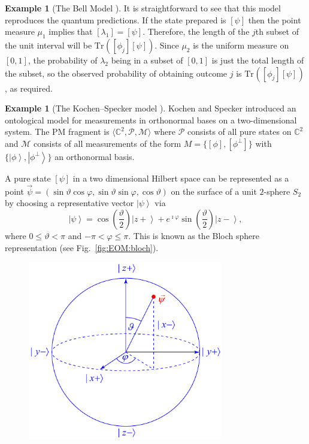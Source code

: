 \documentclass[DIV=calc,fontsize=12pt]{scrartcl} %
\theoremstyle{definition}
\newtheorem{example}[definition]{Example}
\theoremstyle{plain}
\newcommand{\Ket}[1]{\ensuremath{\left \vert #1 \right \rangle}}
\newcommand{\Proj}[1]{\ensuremath{\left [ #1 \right ]}}
\newcommand{\Tr}[2][]{\ensuremath{\text{Tr}_{#1} \left ( #2 \right )}}
\begin{document}
\begin{example}[The Bell Model \cite{Bell1966}]
It is straightforward to see that this model reproduces the quantum
predictions.  If the state prepared is $\Proj{\psi}$ then the point
measure $\mu_1$ implies that $\Proj{\lambda_1} = \Proj{\psi}$.
Therefore, the length of the $j$th subset of the unit interval will
be $\Tr{\Proj{\phi_j}\Proj{\psi}}$.  Since $\mu_2$ is the
uniform measure on $[0,1]$, the probability of $\lambda_2$ being in
a subset of $[0,1]$ is just the total length of the subset, so the
observed probability of obtaining outcome $j$ is
$\Tr{\Proj{\phi_j}\Proj{\psi}}$, as required.
\end{example}

\begin{example}[The Kochen--Specker model \cite{Kochen1967}]
\label{exa:EOM:KS}
Kochen and Specker introduced an ontological model for measurements
in orthonormal bases on a two-dimensional system.  The
PM fragment is $\langle \mathbb{C}^2, \mathcal{P},
\mathcal{M} \rangle$ where $\mathcal{P}$ consists of all pure states
on $\mathbb{C}^2$ and $\mathcal{M}$ consists of all measurements of
the form $M = \{\Proj{\phi},\Proj{\phi^{\perp}}\}$ with
$\{\Ket{\phi},\Ket{\phi^{\perp}}\}$ an orthonormal basis.

A pure state $\Proj{\psi}$ in a two dimensional Hilbert space can be
represented as a point $\vec{\psi} = (\sin \vartheta \cos \varphi,
\sin \vartheta \sin \varphi, \allowbreak \cos \vartheta)$ on the
surface of a unit $2$-sphere $S_2$ by choosing a representative
vector $\Ket{\psi}$ via
\begin{equation}
\label{eq:EOM:Bloch}
\Ket{\psi} = \cos(\frac{\vartheta}{2}) \Ket{z+} +
e^{\imath \varphi}\sin(\frac{\vartheta}{2}) \Ket{z-},
\end{equation}
where $0 \leq \vartheta < \pi$ and $-\pi < \varphi \leq \pi$.  This
is known as the Bloch sphere representation (see
Fig.~\ref{fig:EOM:bloch}).
\begin{figure}[t!]
\centering
\includegraphics[width=85mm]{Fig8.pdf}
\caption{}
\end{figure}


\end{example}
\end{document}
